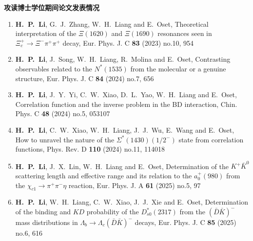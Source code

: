 \thispagestyle{empty}
\fontsize{12pt}{13pt}\selectfont
\begin{center}
	{\xiaoerhao\textbf{攻读博士学位期间论文发表情况}}
\end{center}
\begin{enumerate}
	\item%
		\textbf{H.~P.~Li}, G.~J.~Zhang, W.~H.~Liang and E.~Oset,
Theoretical interpretation of the $\Xi (1620)$ and $\Xi (1690)$ resonances seen in $\Xi _c^+ \rightarrow \Xi ^- \pi ^+ \pi ^+$ decay,
Eur. Phys. J. C \textbf{83} (2023) no.10, 954
	\item%
		\textbf{H.~P.~Li}, J.~Song, W.~H.~Liang, R.~Molina and E.~Oset,
Contrasting observables related to the $N^*(1535)$ from the molecular or a genuine structure,
Eur. Phys. J. C \textbf{84} (2024) no.7, 656
\item%
	\textbf{H.~P.~Li}, J.~Y.~Yi, C.~W.~Xiao, D.~L.~Yao, W.~H.~Liang and E.~Oset,
Correlation function and the inverse problem in the BD interaction,
Chin. Phys. C \textbf{48} (2024) no.5, 053107
\item%
	\textbf{H.~P.~Li}, C.~W.~Xiao, W.~H.~Liang, J.~J.~Wu, E.~Wang and E.~Oset,
How to unravel the nature of the $\Sigma^*(1430)(1/2^-)$ state from correlation functions,
Phys. Rev. D \textbf{110} (2024) no.11, 114018
\item%
	\textbf{H.~P.~Li}, J.~X.~Lin, W.~H.~Liang and E.~Oset,
Determination of the $K^{+}\bar{K}^{0}$ scattering length and effective range and its relation to the $a_{0}^{+}(980)$ from the $\chi_{c1}\to\pi^{+}\pi^{-}\eta$ reaction,
Eur. Phys. J. A \textbf{61} (2025) no.5, 97
\item%
	\textbf{H.~P.~Li}, W.~H.~Liang, C.~W.~Xiao, J.~J.~Xie and E.~Oset,
Determination of the binding and $KD$ probability of the $D^{*}_{s0}(2317)$ from the $(\bar{D}\bar K)^-$ mass distributions in $\Lambda_{b}\to \Lambda_{c} (\bar{D}\bar K)^-$ decays,
Eur. Phys. J. C \textbf{85} (2025) no.6, 616
\end{enumerate}
